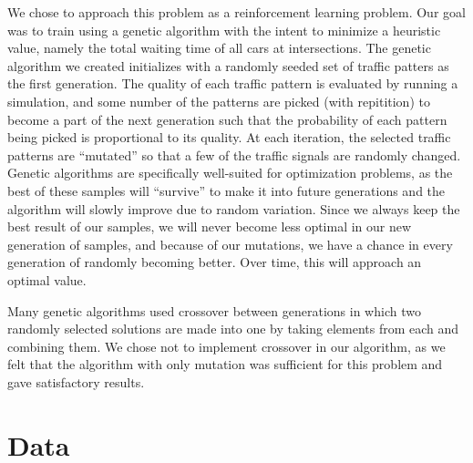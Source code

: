 \documentclass[12pt, letterpaper]{article}
\begin{document}
We chose to approach this problem as a reinforcement learning problem.
Our goal was to train using a genetic algorithm with the intent to minimize a heuristic value, namely the total waiting time of all cars at intersections.
The genetic algorithm we created initializes with a randomly seeded set of traffic patters as the first generation.
The quality of each traffic pattern is evaluated by running a simulation, and some number of the patterns are picked (with repitition) to become a part of the next generation such that the probability of each pattern being picked is proportional to its quality.
At each iteration, the selected traffic patterns are ``mutated'' so that a few of the traffic signals are randomly changed.
Genetic algorithms are specifically well-suited for optimization problems, as the best of these samples will ``survive'' to make it into future generations and the algorithm will slowly improve due to random variation.
Since we always keep the best result of our samples, we will never become less optimal in our new generation of samples, and because of our mutations, we have a chance in every generation of randomly becoming better.
Over time, this will approach an optimal value.

Many genetic algorithms used crossover between generations in which two randomly selected solutions are made into one by taking elements from each and combining them.
We chose not to implement crossover in our algorithm, as we felt that the algorithm with only mutation was sufficient for this problem and gave satisfactory results.


\section*{Data}
\end{document}
